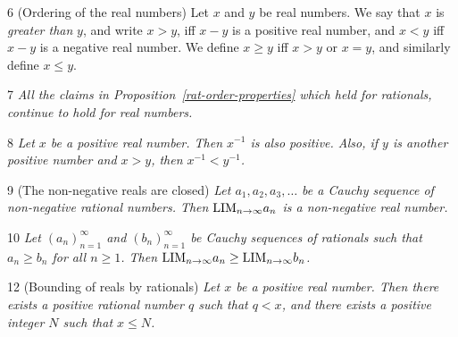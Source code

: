 \begin{definition}{6}
    \label{real-order}
    (Ordering of the real numbers) Let $x$ and $y$ be real numbers. We say that
    $x$ is \emph{greater than} $y$, and write $x > y$, iff $x - y$ is a positive
    real number, and $x < y$ iff $x - y$ is a negative real number. We define
    $x \geq y$ iff $x > y$ or $x = y$, and similarly define $x \leq y$.
\end{definition}

\begin{proposition}{7}
    \label{real-order-laws}
    \emph{All the claims in Proposition~\ref{rat-order-properties} which held for rationals, continue
    to hold for real numbers.}
\end{proposition}

\begin{proposition}{8}
    \label{real-reciprocal-order}
    \emph{Let $x$ be a positive real number. Then $x^{-1}$ is also positive. Also,
    if $y$ is another positive number and $x > y$, then $x^{-1} < y^{-1}$.}
\end{proposition}

\begin{proposition}{9}
    \label{nonneg-reals-closed}
    (The non-negative reals are closed) \emph{Let $a_1, a_2, a_3, \ldots$ be a
    Cauchy sequence of non-negative rational numbers. Then $\text{LIM}_{n \rightarrow \infty}{a_n}$ is
    a non-negative real number.}
\end{proposition}

\begin{corollary}{10}
    \label{formal-limit-monotone}
    \emph{Let $(a_n)_{n=1}^{\infty}$ and $(b_n)_{n=1}^{\infty}$ be Cauchy sequences
    of rationals such that $a_n \geq b_n$ for all $n \geq 1$. Then $\text{LIM}_{n \rightarrow \infty}{a_n}
    \geq \text{LIM}_{n \rightarrow \infty}{b_n}$.}
\end{corollary}

\begin{proposition}{12}
    \label{reals-bounded-by-rationals}
    (Bounding of reals by rationals) \emph{Let $x$ be a positive real number. Then
    there exists a positive rational number $q$ such that $q < x$, and there exists
    a positive integer $N$ such that $x \leq N$.}
\end{proposition}

